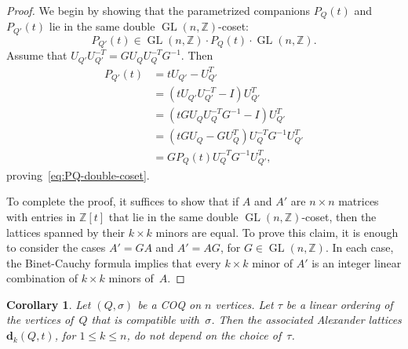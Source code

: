 \documentclass[11pt, letterpaper]{amsart}
\newcommand{\cS}[1]{{\noindent\textsf{\color{purple}$\blacksquare$~#1~$\blacksquare$}}}
\newcommand{\hide}[1]{}
\newtheorem{corollary}[theorem]{Corollary}
\theoremstyle{definition}
\numberwithin{equation}{section}
\def\ZZ{{\mathbb Z}}
\def\dd{{\mathbf{d}}}
\def\GL{{\operatorname{GL}}}
\begin{document}
\begin{proof}
We begin by showing that the parametrized companions $P_Q(t)$ and $P_{Q'}(t)$ lie in the same double $\GL(n,\ZZ)$-coset: 
\begin{equation}
\label{eq:PQ-double-coset}
P_{Q'}(t) \in \GL(n, \ZZ) \cdot P_Q(t) \cdot \GL(n, \ZZ).
\end{equation}
Assume that $ U_{Q'} U_{Q'}^{-T}  = G U_Q U_Q^{-T} G^{-1}.$ 
Then 
\begin{align*}
P_{Q'}(t) &= t U_{Q'} - U_{Q'}^{T} \\ 
&= ( t U_{Q'} U_{Q'}^{-T} - I) U_{Q'}^T\\
&=  ( t G U_Q U_Q^{-T} G^{-1} - I) U_{Q'}^T\\
&=  ( t G U_Q - G U_Q^T) U_Q^{-T} G^{-1} U_{Q'}^T\\
&= G P_Q(t) U_Q^{-T} G^{-1} U_{Q'}^T, 
\end{align*}
proving~\eqref{eq:PQ-double-coset}. 
\hide{
Then one can verify that $P_{Q'}(t) = U_{Q'} G^{-T} U_{Q}^{-1}P_Q(t) G^T$. \cS{computation hidden here.}
\begin{align*}
P_{Q'}(t) &= t U_{Q'} - U_{Q'}^{T} \\ 
&= U_{Q'} ( tI - U_{Q'}^{-1} U_{Q'}^{T}) \\
&=  U_{Q'} ( tI - (U_{Q'} U_{Q'}^{-T} )^{T})\\
&=U_{Q'} ( tI - (G U_{Q} U_{Q}^{-T} G^{-1})^{T}) \\
&= U_{Q'} G^{-T}( tI - (U_{Q} U_{Q}^{-T})^{T}) G^T\\
&= U_{Q'} G^{-T}( tI - U_{Q}^{-1} U_{Q}^{T}) G^T \\
&= U_{Q'} G^{-T} U_{Q}^{-1}P_Q(t)G^T . \qedhere
\end{align*}
}
To complete the proof, it suffices to show that if $A$ and $A'$ are $n\times n$ matrices with entries in $\ZZ[t]$ 
that lie in the same double $\GL(n,\ZZ)$-coset, 
then the lattices spanned by their $k\times k$ minors are equal. 
To prove this claim, it  is enough to consider the cases $A'=GA$ and $A'=AG$, for $G\in\GL(n,\ZZ)$.
In each case, the Binet-Cauchy formula implies that
every $k\times k$ minor of $A'$ is an integer linear combination of $k\times k$ minors of~$A$. 
\end{proof}

\begin{corollary}
\label{cor:alex-lattice-coq}
Let $(Q,\sigma)$ be a COQ on $n$ vertices.
Let $\tau$ be a linear ordering of the vertices of~$Q$ that is compatible with~$\sigma$.
Then the associated Alexander lattices $\dd_k(Q,t)$, for $1\le k\le n$, 
do not depend on the choice of~$\tau$. 
\end{corollary}
\end{document}
